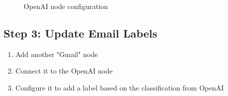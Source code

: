\begin{figure}[h]
    \centering
    \caption{OpenAI node configuration}
\end{figure}

\subsection{Step 3: Update Email Labels}

\begin{enumerate}
    \item Add another "Gmail" node
    \item Connect it to the OpenAI node
    \item Configure it to add a label based on the classification from OpenAI
\end{enumerate}

